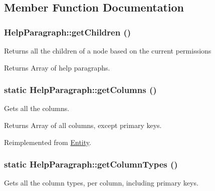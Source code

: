 \subsection{Member Function Documentation}
\hypertarget{classHelpParagraph_ad8f5fd9b0e40916b137f63ba014b51f7}{
\subsubsection[{getChildren}]{\setlength{\rightskip}{0pt plus 5cm}HelpParagraph::getChildren ()}}
\label{classHelpParagraph_ad8f5fd9b0e40916b137f63ba014b51f7}
Returns all the children of a node based on the current permissions

\begin{DoxyReturn}{Returns}
Array of help paragraphs. 
\end{DoxyReturn}
\hypertarget{classHelpParagraph_ae136cb09440d889fe1dc2d552a4995ae}{
\subsubsection[{getColumns}]{\setlength{\rightskip}{0pt plus 5cm}static HelpParagraph::getColumns ()}}
\label{classHelpParagraph_ae136cb09440d889fe1dc2d552a4995ae}
Gets all the columns.

\begin{DoxyReturn}{Returns}
Array of all columns, except primary keys. 
\end{DoxyReturn}


Reimplemented from \hyperlink{classEntity_a394717a08ffd54ec9a14d06727c86719}{Entity}.

\hypertarget{classHelpParagraph_ae270d97d244d3c71ec843e062af29f2c}{
\subsubsection[{getColumnTypes}]{\setlength{\rightskip}{0pt plus 5cm}static HelpParagraph::getColumnTypes ()}}
\label{classHelpParagraph_ae270d97d244d3c71ec843e062af29f2c}
Gets all the column types, per column, including primary keys.

